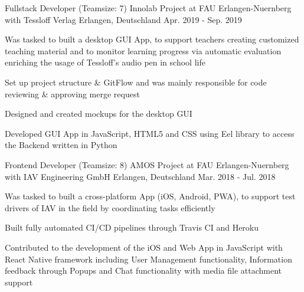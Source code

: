 

\begin{cventries}

  \cventry
    {Fullstack Developer (Teamsize: 7)} %
    {Innolab Project at FAU Erlangen-Nuernberg with Tessloff Verlag} %
    {Erlangen, Deutschland} %
    {Apr. 2019 - Sep. 2019} %
    {
      \begin{cvitems} %
        \item {Was tasked to built a desktop GUI App, to support teachers creating customized teaching material and to monitor learning progress via automatic evaluation enriching the usage of Tessloff's audio pen in school life}
        \item {Set up project structure \& GitFlow and was mainly responsible for code reviewing \& approving merge request}
        \item {Designed and created mockups for the desktop GUI}
        \item {Developed GUI App in JavaScript, HTML5 and CSS using Eel library to access the Backend written in Python}
      \end{cvitems}
    }

  \cventry
    {Frontend Developer (Teamsize: 8)} %
    {AMOS Project at FAU Erlangen-Nuernberg with IAV Engineering GmbH} %
    {Erlangen, Deutschland} %
    {Mar. 2018 - Jul. 2018} %
    {
      \begin{cvitems} %
        \item {Was tasked to built a cross-platform App (iOS, Android, PWA), to support test drivers of IAV in the field by coordinating tasks efficiently}
        \item {Built fully automated CI/CD pipelines through Travis CI and Heroku}
        \item {Contributed to the development of the iOS and Web App in JavaScript with React Native framework including User Management functionality, Information feedback through Popups and Chat functionality with media file attachment support}
      \end{cvitems}
    }


\end{cventries}
